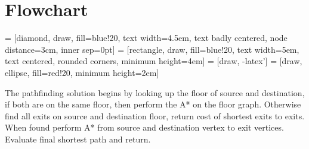
\section{Flowchart}

 = [diamond, draw, fill=blue!20, text width=4.5em, text badly centered, node distance=3cm, inner sep=0pt]
 = [rectangle, draw, fill=blue!20, text width=5em, text centered, rounded corners, minimum height=4em]
 = [draw, -latex']
 = [draw, ellipse, fill=red!20, minimum height=2em]
    

The pathfinding solution begins by looking up the floor of source and destination, if both are on the same floor, then perform the A* on the floor graph. Otherwise find all exits on source and destination floor, return cost of shortest exits to exits. When found perform A* from source and destination vertex to exit vertices. Evaluate final shortest path and return.